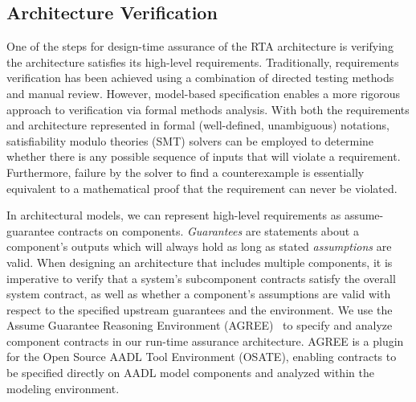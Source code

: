 \subsection{Architecture Verification}


One of the steps for design-time assurance of the RTA architecture is verifying the architecture satisfies its high-level requirements.  Traditionally, requirements verification has been achieved using a combination of directed testing methods and manual review. However, model-based specification enables a more rigorous approach to verification via formal methods analysis. With both the requirements and architecture represented in formal (well-defined, unambiguous) notations, satisfiability modulo theories (SMT) solvers can be employed to determine whether there is any possible sequence of inputs that will violate a requirement.  Furthermore, failure by the solver to find a counterexample is essentially equivalent to a mathematical proof that the requirement can never be violated.  

In architectural models, we can represent high-level requirements as assume-guarantee contracts on components.  \textit{Guarantees} are statements about a component's outputs which will always hold as long as stated \textit{assumptions} are valid.  When designing an architecture that includes multiple components, it is imperative to verify that a system's subcomponent contracts satisfy the overall system contract, as well as whether a component's assumptions are valid with respect to the specified upstream guarantees and the environment.
%
We use the Assume Guarantee Reasoning Environment (AGREE)~\cite{agree2012} to specify and analyze component contracts in our run-time assurance architecture.  AGREE is a plugin for the Open Source AADL Tool Environment (OSATE), enabling contracts to be specified directly on AADL model components and analyzed within the modeling environment.


